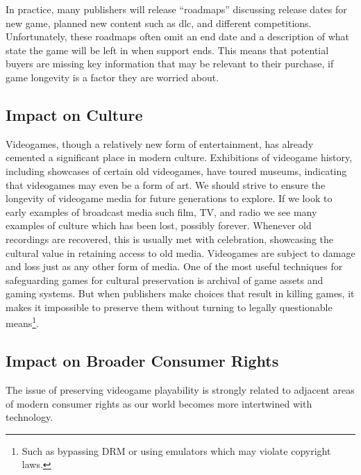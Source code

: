 In practice, many publishers will release ``roadmaps'' discussing release dates for new game, planned new content such as \gls{dlc}, and different competitions.
Unfortunately, these roadmaps often omit an end date and a description of what state the game will be left in when support ends.
This means that potential buyers are missing key information that may be relevant to their purchase, if game longevity is a factor they are worried about.

\subsection{Impact on Culture}
Videogames, though a relatively new form of entertainment, has already cemented a significant place in modern culture.
Exhibitions of videogame history, including showcases of certain old videogames, have toured museums, indicating that videogames may even be a form of art.
We should strive to ensure the longevity of videogame media for future generations to explore.
If we look to early examples of broadcast media such film, TV, and radio we see many examples of culture which has been lost, possibly forever.
Whenever old recordings are recovered, this is usually met with celebration, showcasing the cultural value in retaining access to old media\cite{bbc-archive-2001}.
Videogames are subject to damage and loss just as any other form of media.
One of the most useful techniques for safeguarding games for cultural preservation is archival of game \glspl{asset} and gaming systems.
But when publishers make choices that result in killing games, it makes it impossible to preserve them without turning to legally questionable means\footnote{
    Such as bypassing DRM or using emulators which may violate copyright laws.
}.


\subsection{Impact on Broader Consumer Rights}
The issue of preserving videogame playability is strongly related to adjacent areas of modern consumer rights as our world becomes more intertwined with technology.

